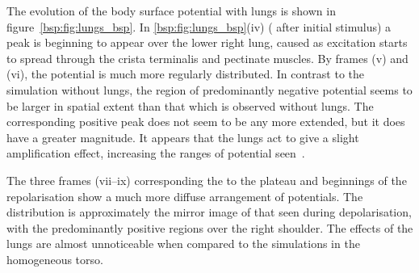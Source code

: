 The evolution of the body surface potential with lungs is shown in
figure~\ref{bsp:fig:lungs_bsp}.
In \ref{bsp:fig:lungs_bsp}(iv) ( after initial stimulus) a peak is
beginning to appear over the lower right lung, caused as excitation starts to
spread through the crista terminalis and pectinate muscles.
By frames (v) and (vi), the potential is much more regularly distributed.
In contrast to the simulation without lungs, the region of predominantly
negative potential seems to be larger in spatial extent than that which is
observed without lungs.
The corresponding positive peak does not seem to be any more extended, but it
does have a greater magnitude.
It appears that the lungs act to give a slight amplification
effect, increasing the ranges of potential seen~\cite{Gulrajani1983}.

The three frames (vii--ix) corresponding the to the plateau and beginnings of the
repolarisation show a much more diffuse arrangement of potentials.
The distribution is approximately the mirror image of that seen during
depolarisation, with the predominantly positive regions over the right shoulder.
The effects of the lungs are almost unnoticeable when compared to the
simulations in the homogeneous torso.

